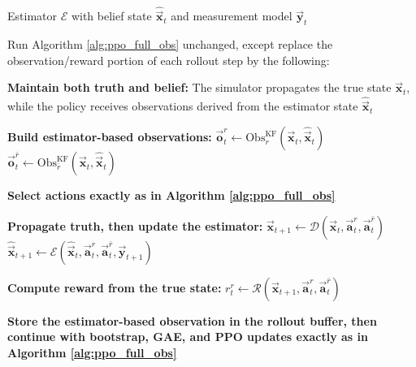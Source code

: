\begin{algorithm}[H]
\caption{KF-On Modifications to Algorithm \ref{alg:ppo_full_obs}}
\label{alg:ppo_kf_on}
\begin{algorithmic}[1]
\Require Estimator $\mathcal{E}$ with belief state $\hat{\vec{\mathbf{x}}}_t$ and measurement model $\vec{\mathbf{y}}_t$

\State Run Algorithm \ref{alg:ppo_full_obs} unchanged, except replace the observation/reward portion of each rollout step by the following:

\State \textbf{Maintain both truth and belief:}
\State \hspace{1em} The simulator propagates the true state $\vec{\mathbf{x}}_t$, while the policy receives observations derived from the estimator state $\hat{\vec{\mathbf{x}}}_t$

\State \textbf{Build estimator-based observations:}
\State \hspace{1em} $\vec{\mathbf{o}}_t^r \leftarrow \mathrm{Obs}^{\mathrm{KF}}_r(\vec{\mathbf{x}}_t,\hat{\vec{\mathbf{x}}}_t)$
\State \hspace{1em} $\vec{\mathbf{o}}_t^{\bar r} \leftarrow \mathrm{Obs}^{\mathrm{KF}}_{\bar r}(\vec{\mathbf{x}}_t,\hat{\vec{\mathbf{x}}}_t)$

\State \textbf{Select actions exactly as in Algorithm \ref{alg:ppo_full_obs}}

\State \textbf{Propagate truth, then update the estimator:}
\State \hspace{1em} $\vec{\mathbf{x}}_{t+1} \leftarrow \mathcal{D}(\vec{\mathbf{x}}_t,\vec{\mathbf{a}}_t^r,\vec{\mathbf{a}}_t^{\bar r})$
\State \hspace{1em} $\hat{\vec{\mathbf{x}}}_{t+1} \leftarrow \mathcal{E}(\hat{\vec{\mathbf{x}}}_t,\vec{\mathbf{a}}_t^r,\vec{\mathbf{a}}_t^{\bar r},\vec{\mathbf{y}}_{t+1})$

\State \textbf{Compute reward from the true state:}
\State \hspace{1em} $r_t^r \leftarrow \mathcal{R}(\vec{\mathbf{x}}_{t+1},\vec{\mathbf{a}}_t^r,\vec{\mathbf{a}}_t^{\bar r})$

\State \textbf{Store the estimator-based observation in the rollout buffer, then continue with bootstrap, GAE, and PPO updates exactly as in Algorithm \ref{alg:ppo_full_obs}}
\end{algorithmic}
\end{algorithm}


